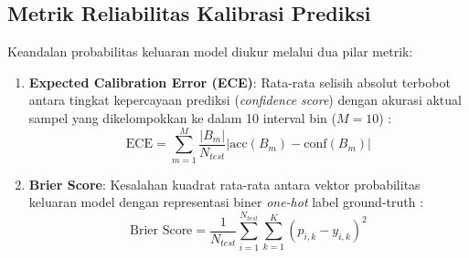 \subsection{Metrik Reliabilitas Kalibrasi Prediksi} \label{III.MetrikKalibrasi}
Keandalan probabilitas keluaran model diukur melalui dua pilar metrik:
\begin{enumerate}[noitemsep]
	\item \textbf{Expected Calibration Error (ECE)}: Rata-rata selisih absolut terbobot antara tingkat kepercayaan prediksi (\textit{confidence score}) dengan akurasi aktual sampel yang dikelompokkan ke dalam 10 interval bin ($M=10$) \cite{guo2017calibration}:
	\begin{equation}
		\text{ECE} = \sum_{m=1}^{M} \frac{|B_m|}{N_{test}} \left| \text{acc}(B_m) - \text{conf}(B_m) \right|
	\end{equation}

	\item \textbf{Brier Score}: Kesalahan kuadrat rata-rata antara vektor probabilitas keluaran model dengan representasi biner \textit{one-hot} label ground-truth \cite{brier1950verification}:
	\begin{equation}
		\text{Brier Score} = \frac{1}{N_{test}} \sum_{i=1}^{N_{test}} \sum_{k=1}^{K} \left(\hat{p}_{i,k} - y_{i,k}\right)^2
	\end{equation}
\end{enumerate}

